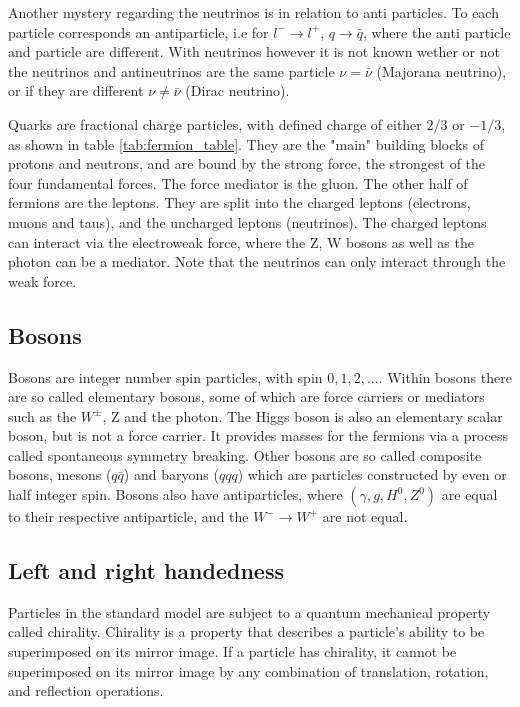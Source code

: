 Another mystery regarding the neutrinos is in relation to anti particles. To each particle corresponds an antiparticle, i.e for $l^-\to l^+$, $q\to \bar{q}$, where the anti particle 
and particle are different. With neutrinos however it is not known wether or not the neutrinos and antineutrinos are the same particle $\nu = \bar{\nu}$ (Majorana neutrino), 
or if they are different $\nu \neq \bar{\nu}$ (Dirac neutrino).
\par
Quarks are fractional charge particles, with defined charge of either $2/3$ or $-1/3$, as shown in table \ref{tab:fermion_table}. They are the "main" building blocks of protons and neutrons, and are bound by the strong 
force, the strongest of the four fundamental forces. The force mediator is the gluon. The other half of fermions are the leptons. They are split into the charged 
leptons (electrons, muons and taus), and the uncharged leptons (neutrinos). The charged leptons can interact via the electroweak force, where the Z, W bosons 
as well as the photon can be a mediator. Note that the neutrinos can only interact through the weak force.

\subsection*{Bosons}
Bosons are integer number spin particles, with spin $0, 1, 2, ...$. Within bosons there are so called elementary bosons, some of which are force carriers or mediators such as the $W^{\pm}$, Z and the photon.
The Higgs boson is also an elementary scalar boson, but is not a force carrier. It provides masses for the fermions via a process called spontaneous symmetry breaking\cite{Pich:819632}. Other 
bosons are so called composite bosons, mesons ($q\bar{q}$) and baryons ($qqq$) which are particles constructed by even or half integer spin. Bosons also have antiparticles, where $(\gamma, g, H^{0}, Z^{0})$ are
 equal to their respective antiparticle, and the $W^{-} \to W^{+}$ are not equal.

\subsection*{Left and right handedness}
Particles in the standard model are subject to a quantum mechanical property called chirality. 
Chirality is a property that describes a particle's ability to be superimposed on its mirror image. 
If a particle has chirality, it cannot be superimposed on its mirror image by any combination of translation, 
rotation, and reflection operations. \cite{weinberg_1995}

